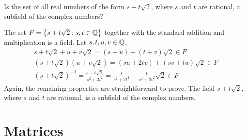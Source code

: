 \begin{example}
Is the set of all real numbers of the form $s + t \sqrt{2}$, where $s$ and $t$ are rational, a subfield of the complex numbers?

The set $F = \left\{ s + t \sqrt{2} : s, t \in \mathbb{Q} \right\}$ together with the standard addition and multiplication is a field.
Let $s, t, u, v \in \mathbb{Q}$,
\begin{gather*}
s + t \sqrt{2} + u + v \sqrt{2} = (s+u) + (t+v) \sqrt{2} \in F \\
\left( s + t \sqrt{2} \right) \left( u + v \sqrt{2} \right) = (su + 2 tv) + (sv + tu) \sqrt{2} \in F \\
\left( s + t \sqrt{2} \right)^{-1} = \frac{ s - t \sqrt{2} }{ s^2 + 2 t^2 }
= \frac{ s }{ s^2 + 2 t^2 } - \frac{ t }{ s^2 + 2 t^2 } \sqrt{2} \in F
\end{gather*}
Again, the remaining properties are straightforward to prove.
The field $s + t \sqrt{2}$, where $s$ and $t$ are rational, is a subfield of the complex numbers.
\end{example}


\section{Matrices}

